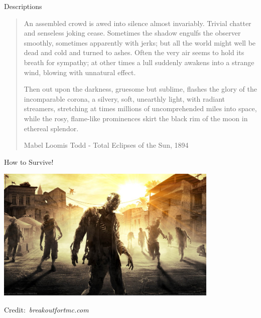 \documentclass[pdf, aspectratio=169]{beamer}
\newcommand{\credit}[1]{\par\hfill\tiny Credit:~\itshape#1\hspace*{.7cm}}
\begin{document}
\begin{frame}{Descriptions}
	\begin{quote}
		An assembled crowd is awed into silence almost invariably. Trivial chatter and senseless joking cease. Sometimes the shadow engulfs the observer smoothly, sometimes apparently with jerks; but all the world might well be dead and cold and turned to ashes. Often the very air seems to hold its breath for sympathy; at other times a lull suddenly awakens into a strange wind, blowing with unnatural effect.

		Then out upon the darkness, gruesome but sublime, flashes the glory of the incomparable corona, a silvery, soft, unearthly light, with radiant streamers, stretching at times millions of uncomprehended miles into space, while the rosy, flame-like prominences skirt the black rim of the moon in ethereal splendor.
		\begin{flushright}
			Mabel Loomis Todd - Total Eclipses of the Sun, 1894
		\end{flushright}
	\end{quote}
\end{frame}

\begin{frame}{How to Survive!}
	\begin{center}
		\includegraphics[width=0.8\textwidth]{zombie.jpg}
		\credit{breakoutfortmc.com}
	\end{center}
\end{frame}
\end{document}
